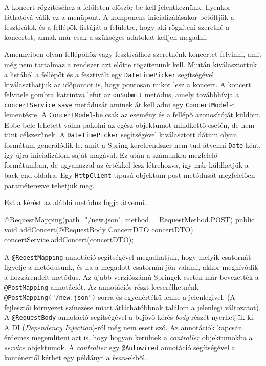 
A koncert rögzítéséhez a felületen először be kell jelentkeznünk. Ilyenkor láthatóvá válik ez a menüpont. A komponens inicializálásakor betöltjük a fesztiválok és a fellépők listáját a felületre, hogy aki rögzíteni szeretné a koncertet, annak már csak a szükséges adatokat kelljen megadni.

Amennyiben olyan fellépőhöz vagy fesztiválhoz szeretnénk koncertet felvinni, amit még nem tartalmaz a rendszer azt előtte rögzítenünk kell. Miután kiválasztottuk a listából a fellépőt és a fesztivált egy \texttt{DateTimePicker} segítségével kiválaszthatjuk az időpontot is, hogy pontosan mikor lesz a koncert. A koncert felvitele gombra kattintva lefut az \texttt{onSubmit} metódus, amely továbbhívja a \texttt{concertService} \texttt{save} metódusát aminek át kell adni egy \texttt{ConcertModel}-t lementésre. A \texttt{ConcertModel}-be csak az esemény és a fellépő azonosítóját küldöm. Ebbe bele lehetett volna pakolni az egész objektumot mindkettő esetén, de nem tünt célszerűnek. A \texttt{DateTimePicker} segítségével kiválasztott dátum olyan formátum generálódik le, amit a Spring keretrendszer nem tud átvenni \texttt{Date}-ként, így újra inicializálom saját magával. Ez után a számunkra megfelelő formátumban, de ugyanazzal az értékkel lesz létrehozva, így már küldhetjük a back-end oldalra. Egy  \texttt{HttpClient} típusú objektum post metódusát megfelelően paraméterezve tehetjük meg.
Ezt a kérést az alábbi metódus fogja átvenni.
\begin{java}
@RequestMapping(path="/new.json", method = RequestMethod.POST)
public void addConcert(@RequestBody ConcertDTO concertDTO){
	concertService.addConcert(concertDTO);
}
\end{java}

A \texttt{@ReqestMapping} annotáció segítségével megadhatjuk, hogy melyik csatornát figyelje a metódusunk, és ha a megadott csatornán jön valami, akkor meghívódik a hozzárendelt metódus. Az újabb verziószámú Springek esetén már bevezették a \texttt{@PostMapping} annotációt. Az annotációs részt lecserélhetnénk \\
\texttt{@PostMapping("/new.json")} sorra és egyenértékű lenne a jelenlegivel. (A fejlesztői környezet színezése miatt átláthatóbbnak találom a jelenlegi változatot). A \texttt{@RequestBody} annotáció segítségével a bejövő kérés \textit{body} részét nyerhetjük ki. A DI (\textit{Dependency Injection})-ról még nem esett szó. Az annotációk kapcsán érdemes megemlíteni azt is, hogy hogyan kerülnek a \textit{controller} objektumokba a \textit{service} objektumok. A \textit{controller} egy \texttt{@Autowired} annotáció segítségével a konténertől kérhet egy példányt a \textit{bean}-ekből. 

